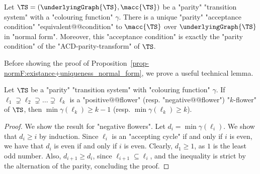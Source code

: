 \documentclass[10pt,a4paper]{amsart}
\renewcommand{\gg}{\gamma}
\begin{document}
\begin{proposition}\label{prop-normF:existance+uniqueness_normal_form}
	Let $\TS = (\underlyingGraph{\TS}, \macc{\TS})$ be a "parity" "transition system" with a "colouring function" $\gg$.
	There is a unique "parity" "acceptance condition"  %
	"equivalent@@condition" to $\macc{\TS}$ over $\underlyingGraph{\TS}$ in "normal form".
	Moreover, this "acceptance condition" is exactly the "parity condition" of the "ACD-parity-transform" of $\TS$.
\end{proposition}

Before showing the proof of Proposition~\ref{prop-normF:existance+uniqueness_normal_form}, we prove a useful technical lemma.
\begin{lemma}\label{lemma-normF:flowers-lower-bound-in-parity}
	Let $\TS$ be a "parity" "transition system" with "colouring function" $\gg$. If $\ell_1\supsetneq \ell_2 \supsetneq \dots \supsetneq \ell_{k}$ is a "positive@@flower" (resp. "negative@@flower") "$k$-flower" of $\TS$, then $\min \gg(\ell_k)\geq k-1$ (resp. $\min \gg(\ell_k)\geq k$).
\end{lemma}
\begin{proof}
	We show the result for "negative flowers". Let $d_i = \min \gg(\ell_i)$. We show that $d_i\geq i$ by induction. Since $\ell_i$ is an "accepting cycle" if and only if $i$ is even, we have that $d_i$ is even if and only if $i$ is even. Clearly, $d_1\geq 1$, as $1$ is the least odd number. Also, $d_{i+1}\geq d_i$, since $ \ell_{i+1}\subseteq \ell_i$, and the inequality is strict by the alternation of the parity, concluding the proof.
\end{proof}
\end{document}
